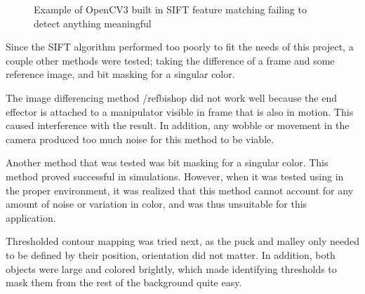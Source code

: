 \documentclass[letterpaper, 12 pt, conference]{ieeeconf}
\begin{document}
\begin{figure}[!h]
\centering
{}
\caption{Example of OpenCV3 built in SIFT feature matching failing to detect anything meaningful}
\end{figure}


Since the SIFT algorithm performed too poorly to fit the needs of this project, a couple other methods were tested; taking the difference of a frame and some reference image, and bit masking for a singular color. 

The image differencing method /ref{bishop} did not work well because the end effector is attached to a manipulator visible in frame that is also in motion.  This caused interference with the result. In addition, any wobble or movement in the camera produced too much noise for this method to be viable.  

Another method that was tested was bit masking for a singular color.  This method proved successful in simulations.  However, when it was tested using in the proper environment, it was realized that this method cannot account for any amount of noise or variation in color, and was thus unsuitable for this application.

Thresholded contour mapping was tried next, as the puck and malley only needed to be defined by their position, orientation did not matter. In addition, both objects were large and colored brightly, which made identifying thresholds to mask them from the rest of the background quite easy. 
\end{document}
